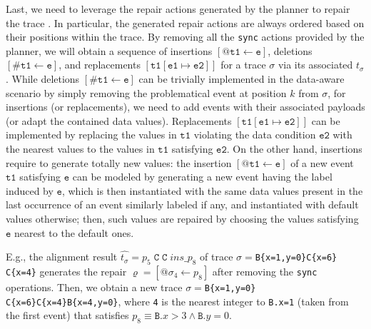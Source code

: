 Last, we need to leverage the repair actions generated by the planner to repair the  trace . In particular, the generated repair actions are always ordered based on their positions within the trace. By removing all the \texttt{sync} actions provided by the planner, we will obtain a sequence of insertions $[@\texttt{t1}\leftarrow \texttt{e}]$, deletions $[\#\texttt{t1}\leftarrow \texttt{e}]$, and replacements $[\texttt{t1}[ \texttt{e1}\mapsto  \texttt{e2}]]$ for a trace $\sigma$ via its associated $t_\sigma$. While deletions $[\#\texttt{t1}\leftarrow \texttt{e}]$ can be trivially implemented in the data-aware scenario by simply removing the problematical event at position $k$ from $\sigma$, for insertions (or replacements), we need to add events with their associated payloads (or adapt the contained data values). Replacements $[\texttt{t1}[\texttt{e1}\mapsto  \texttt{e2}]]$ can be implemented by replacing the values in $\texttt{t1}$ violating the data condition $\texttt{e2}$ with the nearest values to the values in $\texttt{t1}$ satisfying $\texttt{e2}$. On the other hand, insertions require to generate totally new values: the insertion $[@\texttt{t1}\leftarrow \texttt{e}]$ of a new event $\texttt{t1}$ satisfying $\texttt{e}$ can be modeled by generating a new event having the label induced by $\texttt{e}$, which is then instantiated with the same data values present in the last occurrence of an event similarly labeled if any, and instantiated with default values otherwise; then, such values are repaired by choosing the values satisfying $\texttt{e}$ nearest to the default ones.

E.g., the alignment result $\hat{t_\sigma}=p_5\;\texttt{C}\;\texttt{C}\;\textit{ins\_}p_8$ of trace $\sigma=$\texttt{B\{x=1,y=0\}C\{x=6\}\\C\{x=4\}} generates the repair $\varrho=[@\sigma_4\leftarrow p_8]$ after removing the \texttt{sync} operations. Then, we obtain a new trace $\sigma=$\texttt{B\{x=1,y=0\}$  $C\{x=6\}C\{x=4\}B\{x=4,y=0\}}, where \texttt{4} is the nearest integer to \texttt{B.x=1} (taken from the first event) that satisfies $p_8\equiv\texttt{B}.x>3\wedge \texttt{B}.y=0$. 